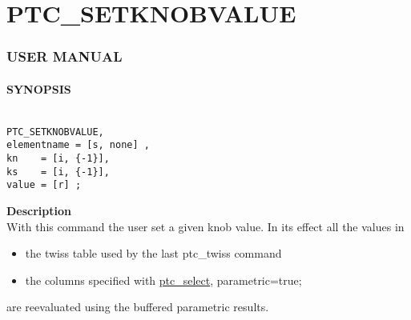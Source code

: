 


\section{PTC\_SETKNOBVALUE}





\subsubsection{   USER MANUAL   }


\paragraph{SYNOPSIS}
\begin{verbatim}

PTC_SETKNOBVALUE, 
elementname = [s, none] , 
kn    = [i, {-1}], 
ks    = [i, {-1}], 
value = [r] ; 

\end{verbatim}


\textbf{ Description }\\
  With this command the user set a given knob value. In its effect all the values in 
\begin{itemize}
	\item  the twiss table used by the last ptc\_twiss command 
	\item  the columns specified with \href{PTC_Select.html}{ptc\_select}, parametric=true;
\end{itemize} are reevaluated using the buffered parametric results.  

